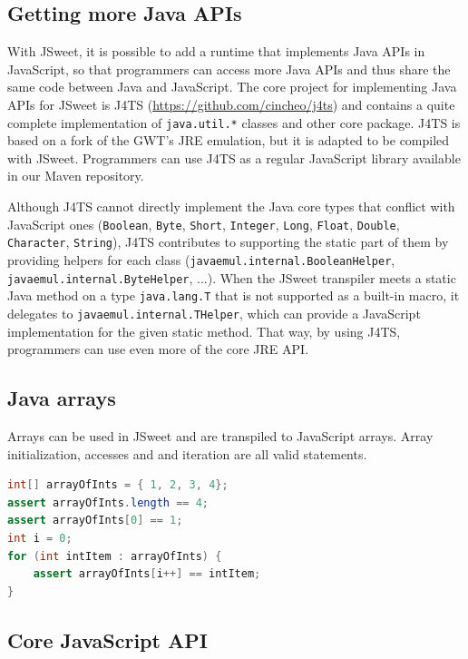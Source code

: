 \documentclass[a4paper]{report}
\begin{document}
\subsection{Getting more Java APIs}

With JSweet, it is possible to add a runtime that implements Java APIs in JavaScript, so that programmers can access more Java APIs and thus share the same code between Java and JavaScript. The core project for implementing Java APIs for JSweet is J4TS (\url{https://github.com/cincheo/j4ts}) and contains a quite complete implementation of \texttt{java.util.*} classes and other core package. J4TS is based on a fork of the GWT's JRE emulation, but it is adapted to be compiled with JSweet. Programmers can use J4TS as a regular JavaScript library available in our Maven repository.

Although J4TS cannot directly implement the Java core types that conflict with JavaScript ones (\texttt{Boolean}, \texttt{Byte}, \texttt{Short}, \texttt{Integer}, \texttt{Long}, \texttt{Float}, \texttt{Double}, \texttt{Character}, \texttt{String}), J4TS contributes to supporting the static part of them by providing helpers for each class (\texttt{javaemul.internal.BooleanHelper}, \texttt{javaemul.internal.ByteHelper}, ...). When the JSweet transpiler meets a static Java method on a type \texttt{java.lang.T} that is not supported as a built-in macro, it delegates to \texttt{javaemul.internal.THelper}, which can provide a JavaScript implementation for the given static method. That way, by using J4TS, programmers can use even more of the core JRE API.

\subsection{Java arrays}

Arrays can be used in JSweet and are transpiled to JavaScript arrays. Array initialization, accesses and and iteration are all valid statements.

\begin{lstlisting}[language=Java]
int[] arrayOfInts = { 1, 2, 3, 4};
assert arrayOfInts.length == 4;  
assert arrayOfInts[0] == 1;
int i = 0;
for (int intItem : arrayOfInts) { 
	assert arrayOfInts[i++] == intItem;
}
\end{lstlisting}

\subsection{Core JavaScript API}
\end{document}
